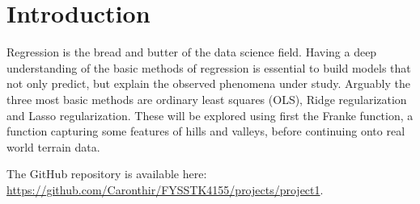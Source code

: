 \section{Introduction}

Regression is the bread and butter of the data science field. Having a deep
understanding of the basic methods of regression is essential to build models
that not only predict, but explain the observed phenomena under study. Arguably
the three most basic methods are ordinary least squares (OLS), Ridge
regularization and Lasso regularization. These will be explored using first the
Franke function, a function capturing some features of hills and valleys, before
continuing onto real world terrain data.

The GitHub repository is available here: \url{https://github.com/Caronthir/FYSSTK4155/projects/project1}.
